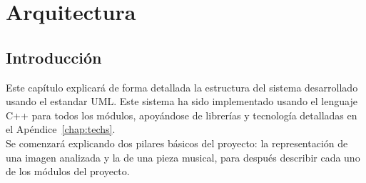 \chapter{Arquitectura}
\label{chap:arquitectura}

\section{Introducción}

Este capítulo explicará de forma detallada la estructura del sistema desarrollado usando el estandar UML. Este sistema ha sido implementado usando el lenguaje C++ para todos los módulos, apoyándose de librerías y tecnología detalladas en el Apéndice~\ref{chap:techs}.\\

Se comenzará explicando dos pilares básicos del proyecto: la representación de una imagen analizada y la de una pieza musical, para después describir cada uno de los módulos del proyecto.\\




